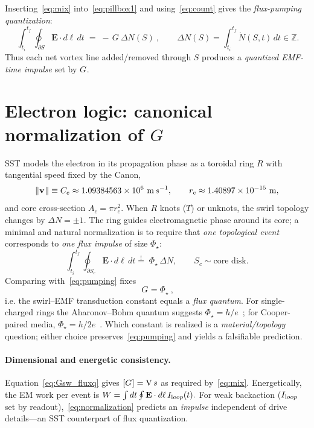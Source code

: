 \documentclass[10pt,reprint,aps,onecolumn,nofootinbib]{revtex4-2}
\def\boldsymbol#1{#1}%
\def\mathcal#1{#1}%
\def\!{}%
\def\swirlarrow{}%
\DeclareRobustCommand{\swirlarrow}{%
    \mathchoice{\mkern-2mu\scriptstyle\boldsymbol{\circlearrowleft}}%
    {\mkern-2mu\scriptstyle\boldsymbol{\circlearrowleft}}%
    {\mkern-2mu\scriptscriptstyle\boldsymbol{\circlearrowleft}}%
    {\mkern-2mu\scriptscriptstyle\boldsymbol{\circlearrowleft}}%
}
\begin{document}
Inserting~\ref{eq:mix} into~\ref{eq:pillbox1} and using~\ref{eq:count} gives the \emph{flux-pumping quantization}:
\begin{equation}
\boxed{\ \int_{t_i}^{t_f}\!\!\oint_{\partial S}\mathbf E\!\cdot d\boldsymbol\ell\,dt
\;=\; -\,\mathcal G_{\swirlarrow}\, \Delta N(S)\ },
\qquad \Delta N(S)=\int_{t_i}^{t_f}\!\dot N(S,t)\,dt \in \mathbb Z.
\label{eq:pumping}
\end{equation}
Thus each net vortex line added/removed through $S$ produces a \emph{quantized EMF-time impulse} set by $\mathcal G_{\swirlarrow}$.

\section{Electron logic: canonical normalization of \texorpdfstring{$\mathcal G$}{G}}
SST models the electron in its propagation phase as a toroidal ring $\mathcal R$ with tangential speed fixed by the Canon,
\begin{equation}
\|\mathbf v_{\swirlarrow}\| \equiv C_e \approx 1.09384563\times 10^6~{\textrm m\,s^{-1}},
\qquad r_c \approx 1.40897\times 10^{-15}~{\textrm m},
\label{eq:canonCe}
\end{equation}
and core cross-section $A_c=\pi r_c^2$. When $\mathcal R$ knots ($\mathcal T$) or unknots, the swirl topology changes by $\Delta N=\pm 1$. The ring guides electromagnetic phase around its core; a minimal and natural normalization is to require that \emph{one topological event} corresponds to \emph{one flux impulse} of size $\Phi_\star$:
\begin{equation}
\int_{t_i}^{t_f}\!\!\oint_{\partial S_c}\mathbf E\!\cdot d\boldsymbol\ell\,dt
\stackrel{!}{=}\; \Phi_\star \,\Delta N,
\qquad S_c \sim \text{core disk}.
\label{eq:normalization}
\end{equation}
Comparing with~\ref{eq:pumping} fixes
\begin{equation}
\boxed{\ \mathcal G_{\swirlarrow} = \Phi_\star \ },
\label{eq:Gsw_fluxq}
\end{equation}
i.e. the swirl--EMF transduction constant equals a \emph{flux quantum}. For single-charged rings the Aharonov--Bohm quantum suggests $\Phi_\star=h/e$~\cite{Aharonov1959}; for Cooper-paired media, $\Phi_\star=h/2e$~\cite{Tinkham2004}. Which constant is realized is a \emph{material/topology} question; either choice preserves~\ref{eq:pumping} and yields a falsifiable prediction.

\paragraph{Dimensional and energetic consistency.}
    Equation~\ref{eq:Gsw_fluxq} gives $[\mathcal G_{\swirlarrow}]={\textrm V\,s}$ as required by~\ref{eq:mix}. Energetically, the EM work per event is
    \(
    W=\int dt\oint \mathbf E\cdot d\boldsymbol\ell\,I_{\textrm loop}(t).
    \)
    For weak backaction ($I_{\textrm loop}$ set by readout),~\ref{eq:normalization} predicts an \emph{impulse} independent of drive details—an SST counterpart of flux quantization.
\end{document}
